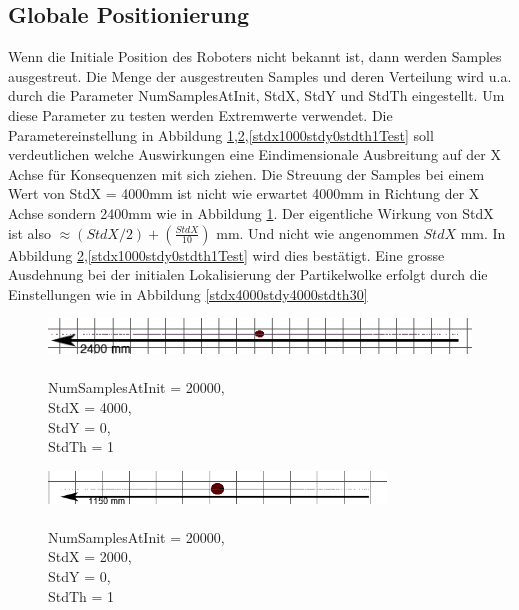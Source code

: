 \documentclass{article}
\begin{document}
\subsection{Globale Positionierung}\label{globalPos}
Wenn die Initiale Position des Roboters nicht bekannt ist, dann werden Samples ausgestreut. Die Menge der ausgestreuten Samples und deren Verteilung wird u.a. durch die Parameter NumSamplesAtInit, StdX, StdY und StdTh eingestellt.
Um diese Parameter zu testen werden Extremwerte verwendet. Die Parametereinstellung in Abbildung \ref{stdx4000stdy0stdth1Test},\ref{stdx2000stdy0stdth1Test},\ref{stdx1000stdy0stdth1Test} soll verdeutlichen welche Auswirkungen eine Eindimensionale Ausbreitung auf der X Achse f\"ur Konsequenzen mit sich ziehen. 
Die Streuung der Samples bei einem Wert von StdX = 4000mm ist nicht wie erwartet 4000mm in Richtung der X Achse sondern 2400mm wie in Abbildung \ref{stdx4000stdy0stdth1Test}. Der eigentliche Wirkung von StdX ist also  $\approx \left(StdX/2\right)+(\frac{StdX}{10})$ mm. Und nicht wie angenommen $StdX$ mm. In Abbildung \ref{stdx2000stdy0stdth1Test},\ref{stdx1000stdy0stdth1Test} wird dies best\"atigt.
Eine grosse Ausdehnung bei der initialen Lokalisierung der Partikelwolke erfolgt durch die Einstellungen wie in Abbildung \ref{stdx4000stdy4000stdth30}

\begin{figure}
	\centering
	\includegraphics[width=1\textwidth]{img/stdx4000stdy0stdth1.png}
	\caption{\\ NumSamplesAtInit = 20000, \\ StdX = 4000,\\ StdY = 0,\\ StdTh = 1}
	\label{stdx4000stdy0stdth1Test}
\end{figure}

\begin{figure}
	\centering
	\includegraphics[width=0.8\textwidth]{img/stdx2000stdy0stdth1.png}
	\caption{\\ NumSamplesAtInit = 20000, \\ StdX = 2000,\\ StdY = 0,\\ StdTh = 1}
	\label{stdx2000stdy0stdth1Test}
\end{figure}
\end{document}
